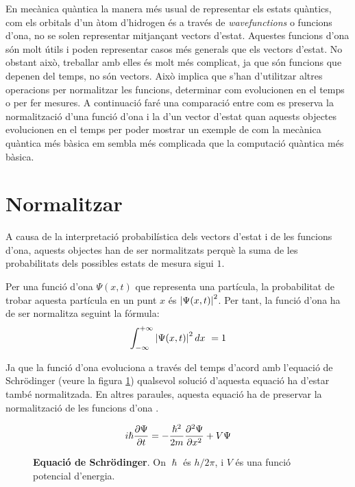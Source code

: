 En mecànica quàntica la manera més usual de representar els estats quàntics, com els orbitals d'un àtom d'hidrogen és a través de \textit{wavefunctions} o funcions d'ona, no se solen representar mitjançant vectors d'estat. Aquestes funcions d'ona són molt útils i poden representar casos més generals que els vectors d'estat. No obstant això, treballar amb elles és molt més complicat, ja que són funcions que depenen del temps, no són vectors. Això implica que s'han d'utilitzar altres operacions per normalitzar les funcions, determinar com evolucionen en el temps o per fer mesures. A continuació faré una comparació entre com es preserva la normalització d'una funció d'ona i la d'un vector d'estat quan aquests objectes evolucionen en el temps per poder mostrar un exemple de com la mecànica quàntica més bàsica em sembla més complicada que la computació quàntica més bàsica.

\section{Normalitzar}
A causa de la interpretació probabilística dels vectors d'estat i de les funcions d'ona, aquests objectes han de ser normalitzats perquè la suma de les probabilitats dels possibles estats de mesura sigui $1$.

Per una funció d'ona $\Psi(x,t)$ que representa una partícula, la probabilitat de trobar aquesta partícula en un punt $x$ és $\abs{\Psi(x,t)}^2$. Per tant, la funció d'ona ha de ser normalitza seguint la fórmula:
\begin{equation}
\int_{-\infty}^{+\infty}\abs{\Psi(x,t)}^2\, dx\ = 1
\label{eq:norm_wave}
\end{equation}

Ja que la funció d'ona evoluciona a través del temps d'acord amb l'equació de Schrödinger
 (veure la figura \ref{fig:schro}) qualsevol solució d'aquesta equació ha d'estar també normalitzada. En altres paraules, aquesta equació ha de preservar la normalització de les funcions d'ona \cite{IntroQM:normalizing}.
\begin{figure}[H]
	$$
	i\hslash \pdv{\Psi}{t} = -\frac{\hslash^2}{2m}\pdv[2]{\Psi}{x}+V\Psi
	$$
	\caption{\textbf{Equació de Schrödinger}. On $\hslash$ és $h/2\pi$, i $V$ és una funció potencial d'energia.}
	\label{fig:schro}
\end{figure}

